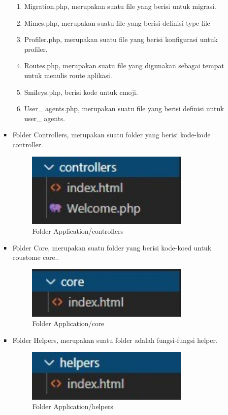 \begin{itemize}
\begin{itemize}
\begin{itemize}
\begin{enumerate}
				\item Migration.php, merupakan suatu file yang berisi untuk migrasi.
				\item Mimes.php, merupakan suatu file yang berisi definisi type file
				\item Profiler.php, merupakan suatu file yang berisi konfigurasi untuk profiler.
				\item Routes.php, merupakan suatu file yang digunakan sebagai tempat untuk menulis route aplikasi.
				\item Smileys.php, berisi kode untuk emoji.
				\item User\_ agents.php, merupakan suatu file yang berisi definisi untuk user\_ agents.
			\end{enumerate}
			
			\item Folder Controllers, merupakan suatu folder yang berisi kode-kode controller.
			\begin{figure}[H]
				\includegraphics[width=8cm]{figures/instalasi/ci17.jpg}
				\centering
				\caption{Folder Application/controllers}
			\end{figure}			

			\item Folder Core, merupakan suatu folder yang berisi kode-koed untuk coustome core..
			\begin{figure}[H]
				\includegraphics[width=8cm]{figures/instalasi/ci18.jpg}
				\centering
				\caption{Folder Application/core}
			\end{figure}
		
			\item Folder Helpers, merupakan suatu folder adalah fungsi-fungsi helper.
			\begin{figure}[H]
				\includegraphics[width=8cm]{figures/instalasi/ci19.jpg}
				\centering
				\caption{Folder Application/helpers}
			\end{figure}
			

\end{itemize}
\end{itemize}
\end{itemize}
